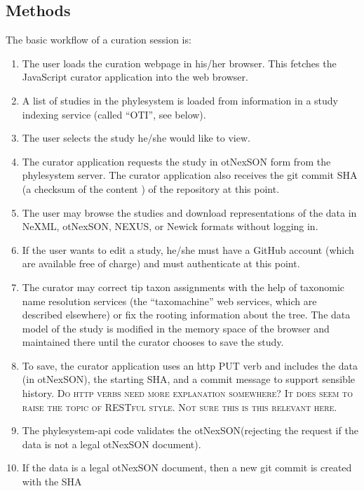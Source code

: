 \documentclass{bioinfo}
\newcommand{\ps}{phylesystem\xspace}
\newcommand{\nexson}{otNexSON\xspace}
\newcommand{\js}{JavaScript\xspace}
\newcommand{\ejmcomment}[1]{{\color{green} \textsc{#1}}\xspace}
\newcommand{\jfacomment}[1]{{\color{blue} \textsc{#1}}\xspace}
\begin{document}
\begin{methods}
\section{Methods}
The basic workflow of a curation session is:
\begin{enumerate}
    \item \label{loadAppStep} The user loads the curation webpage in his/her browser.  This fetches the \js curator application into the web browser.
    \item \label{otiListStep} A list of studies in the \ps is loaded from information in a study indexing service (called ``OTI'', see below).
    \item The user selects the study he/she would like to view.
    \item \label{getStudyStep} The curator application requests the study in \nexson form from the \ps server.
        The curator application also receives the git commit SHA (a checksum of the content ) of the repository at this point.
    \item \label{browseStep} The user may browse the studies and download representations of the data in NeXML, \nexson, NEXUS\cite{NEXUS}, or Newick formats without logging in.
    \item \label{authStep} If the user wants to edit a study, he/she must have a GitHub account (which are available free of charge) and must authenticate at this point.
    \item \label{userEditStep} The curator may correct tip taxon assignments with the help of taxonomic name resolution services (the ``taxomachine'' web services, which are described
        elsewhere) or fix the rooting information about the tree. The data model of the study is modified in the memory space of the 
        browser and maintained there until the curator chooses to save the study.
    \item \label{putStep} To save, the curator application uses an http PUT verb and includes the data (in \nexson), the starting SHA, and a commit message to support sensible history. 
        \ejmcomment{Do http verbs need more explanation somewhere?} 
        \jfacomment{It does seem to raise the topic of RESTful style. Not sure this is this relevant here.}
    \item \label{validateStep} The \ps-api code validates the \nexson (rejecting the request if the data is not a legal \nexson document).
    \item \label{gitSaveStep} If the data is a legal \nexson document, then a new git commit is created with the SHA

\end{enumerate}
\end{methods}
\end{document}

